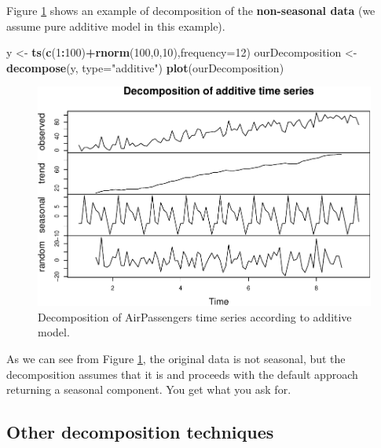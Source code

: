 \documentclass[]{book}
\newenvironment{Shaded}{\begin{snugshade}}{\end{snugshade}}
\newcommand{\DataTypeTok}[1]{\textcolor[rgb]{0.13,0.29,0.53}{#1}}
\newcommand{\DecValTok}[1]{\textcolor[rgb]{0.00,0.00,0.81}{#1}}
\newcommand{\KeywordTok}[1]{\textcolor[rgb]{0.13,0.29,0.53}{\textbf{#1}}}
\newcommand{\NormalTok}[1]{#1}
\newcommand{\OperatorTok}[1]{\textcolor[rgb]{0.81,0.36,0.00}{\textbf{#1}}}
\newcommand{\StringTok}[1]{\textcolor[rgb]{0.31,0.60,0.02}{#1}}
\theoremstyle{definition}
\theoremstyle{definition}
\theoremstyle{definition}
\theoremstyle{definition}
\theoremstyle{remark}
\begin{document}
Figure \ref{fig:decomposeRandomNoise} shows an example of decomposition of the \textbf{non-seasonal data} (we assume pure additive model in this example).

\begin{Shaded}
\begin{Highlighting}[]
\NormalTok{y <-}\StringTok{ }\KeywordTok{ts}\NormalTok{(}\KeywordTok{c}\NormalTok{(}\DecValTok{1}\OperatorTok{:}\DecValTok{100}\NormalTok{)}\OperatorTok{+}\KeywordTok{rnorm}\NormalTok{(}\DecValTok{100}\NormalTok{,}\DecValTok{0}\NormalTok{,}\DecValTok{10}\NormalTok{),}\DataTypeTok{frequency=}\DecValTok{12}\NormalTok{)}
\NormalTok{ourDecomposition <-}\StringTok{ }\KeywordTok{decompose}\NormalTok{(y, }\DataTypeTok{type=}\StringTok{"additive"}\NormalTok{)}
\KeywordTok{plot}\NormalTok{(ourDecomposition)}
\end{Highlighting}
\end{Shaded}

\begin{figure}
\centering
\includegraphics{Svetunkov--2022----ADAM_files/figure-latex/decomposeRandomNoise-1.pdf}
\caption{\label{fig:decomposeRandomNoise}Decomposition of AirPassengers time series according to additive model.}
\end{figure}

As we can see from Figure \ref{fig:decomposeRandomNoise}, the original data is not seasonal, but the decomposition assumes that it is and proceeds with the default approach returning a seasonal component. You get what you ask for.

\hypertarget{other-decomposition-techniques}{%
\subsection{Other decomposition techniques}\label{other-decomposition-techniques}}
\end{document}

